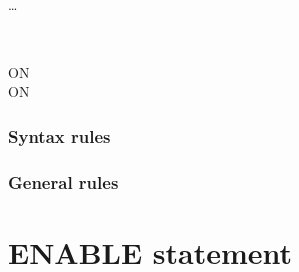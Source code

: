\begin{syntax}
  \begin{1=}
    \identifier \\
    \literal
  \end{1=}
  \begin{1=}
     \\
  \end{1=}
  \begin{1=}
    \identifier \\
    \literal
  \end{1=}

  \begin{1=}
    \begin{1=}
      \identifier \\
      \literal
    \end{1=}
    \begin{0-1}
    \end{0-1}
  \end{1=}
  \ldots

  \begin{0-1}
    \begin{1=}
      \identifier \\
      \literal
    \end{1=}
  \end{0-1}

  \begin{0+}
    ON   \imperativestatement \\
     ON   \imperativestatement
  \end{0+}

  \begin{0-1}
  \end{0-1}
\end{syntax}

\subsubsection{Syntax rules}

\subsubsection{General rules}

\section{ENABLE statement}

